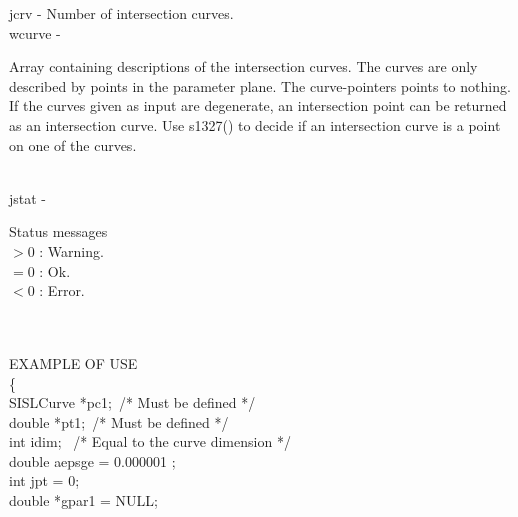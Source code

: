         \>\>    {\fov jcrv}   \> - \> Number of intersection curves.\\
        \>\>    {\fov wcurve} \> - \> \begin{minipg2}
                                        Array containing descriptions of
                                        the intersection curves. The
                                        curves are only described by
                                        points in the parameter
                                        plane. The curve-pointers points
                                        to nothing.\\
                                        If the curves given as input are
                                        degenerate, an intersection
                                        point can be returned as an
                                        intersection curve. Use s1327() to
                                        decide if an intersection curve
                                        is a point on one of the
                                        curves.
                                      \end{minipg2}\\[0.8ex]
        \>\>    {\fov jstat}  \> - \> \begin{minipg2}
                                        Status messages\\
                                        $> 0$      : Warning.\\
                                        $= 0$      : Ok.\\
                                        $< 0$      : Error.\\
                                      \end{minipg2}\\[0.8ex]
\\
EXAMPLE OF USE\\
        \>      \{ \\
        \>\>    SISLCurve \>  *{\fov pc1}; \,/* Must be defined */\\
        \>\>    double    \>  *{\fov pt1}; \,/* Must be defined */\\
        \>\>    int       \>  {\fov idim}; \, /* Equal to the curve dimension */ \\
        \>\>    double    \>  {\fov aepsge} = 0.000001 ;\\
        \>\>    int       \>  {\fov jpt} = 0;\\
        \>\>    double    \>  *{\fov gpar1} = NULL;\\

